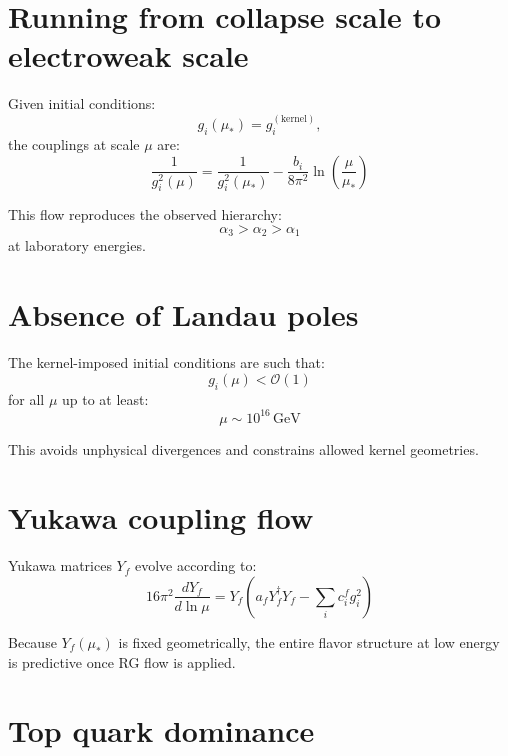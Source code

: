\documentclass[11pt]{book}
\begin{document}
\section{Running from collapse scale to electroweak scale}

Given initial conditions:
\begin{equation}
g_i(\mu_\ast) = g_i^{(\mathrm{kernel})},
\end{equation}
the couplings at scale $\mu$ are:
\begin{equation}
\frac{1}{g_i^2(\mu)}
=
\frac{1}{g_i^2(\mu_\ast)}
-
\frac{b_i}{8\pi^2}
\ln\!\left(\frac{\mu}{\mu_\ast}\right)
\end{equation}

This flow reproduces the observed hierarchy:
\begin{equation}
\alpha_3 > \alpha_2 > \alpha_1
\end{equation}
at laboratory energies.

\section{Absence of Landau poles}

The kernel-imposed initial conditions are such that:
\begin{equation}
g_i(\mu) < \mathcal{O}(1)
\end{equation}
for all $\mu$ up to at least:
\begin{equation}
\mu \sim 10^{16}\,\mathrm{GeV}
\end{equation}

This avoids unphysical divergences and constrains allowed kernel geometries.

\section{Yukawa coupling flow}

Yukawa matrices $Y_f$ evolve according to:
\begin{equation}
16\pi^2 \frac{dY_f}{d\ln\mu}
=
Y_f
\left(
a_f Y_f^\dagger Y_f
-
\sum_i c_i^f g_i^2
\right)
\end{equation}

Because $Y_f(\mu_\ast)$ is fixed geometrically, the entire flavor structure
at low energy is predictive once RG flow is applied.

\section{Top quark dominance}
\end{document}
